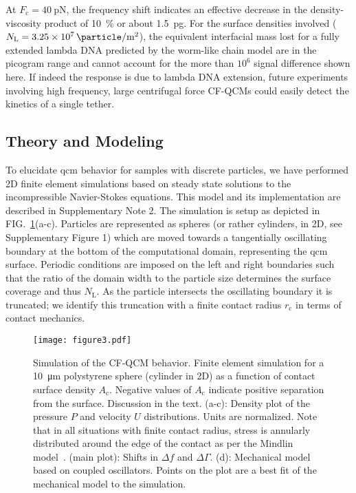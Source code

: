 \documentclass[floatfix,superscriptaddress,a4paper,twocolumn]{revtex4-1}
\newcommand{\Figure}[1]{FIG.~\ref{#1}}
\newcommand{\df}{\Delta\!f}
\newcommand{\dg}{\Delta\Gamma}
\newcommand{\todo}[1]{%
\textcolor{tangoorange}{#1}
}
\begin{document}
At $F_\mathrm{c}=\SI{40}{\pico\newton}$, the frequency shift indicates an
effective decrease in the density-viscosity product of \SI{10}{\percent} or
about \SI{1.5}{\pico\gram}.  For the surface densities involved
($N_\mathrm{L}=\SI{3.25e7}{\particle\per\meter\squared}$), the equivalent
interfacial mass lost for a fully extended lambda DNA predicted by the
worm-like chain model are in the picogram range and cannot account for the
more than $10^6$ signal difference shown here.  If indeed the response is
due to lambda DNA extension, future experiments involving high frequency,
large centrifugal force CF-QCMs could easily detect the kinetics of a
single tether.

\subsection*{Theory and Modeling}
\label{sec:theoryandmodeling}
To elucidate \gls{qcm} behavior for samples with discrete particles, we have
performed 2D finite element simulations based on steady state solutions to
the incompressible Navier-Stokes equations.  This model and its
implementation are described in Supplementary Note 2.  The
simulation is setup as depicted in \mbox{\Figure{fig:lowersphere}(a-c)}.  Particles
are represented as spheres (or rather cylinders, in 2D, see Supplementary
Figure 1) which are moved
towards a tangentially oscillating boundary at the bottom of the
computational domain, representing the \gls{qcm} surface.  Periodic conditions
are imposed on the left and right boundaries such that the ratio of the
domain width to the particle size determines the surface coverage and thus
$N_\mathrm{L}$.  As the particle intersects the oscillating boundary it is
truncated; we identify this truncation with a finite contact radius
$r_\mathrm{c}$ in terms of contact mechanics.
\begin{figure}[ht]
  \centering
  \texttt{[image: figure3.pdf]}
  \caption{%
    Simulation of the CF-QCM behavior.
    Finite element simulation for a \SI{10}{\micro\meter} polystyrene
    sphere (cylinder in 2D) as a function of contact surface density
    $A_\mathrm{c}$.  Negative values of $A_\mathrm{c}$ indicate positive
    separation from the surface.  Discussion in the text. (a-c): Density plot
    of the pressure $P$ and velocity $U$ distributions. Units are normalized.
    Note that in all situations with finite contact radius,
    stress is annularly distributed around the edge of the contact as per the
    Mindlin model~\cite{kumacheva1998interfacial}.
    (main plot): Shifts in $\df$ and $\dg$.
    (d): Mechanical model based on coupled oscillators. Points on the plot are
    a best fit of the mechanical model to the simulation.}
  \label{fig:lowersphere}
\end{figure}
\end{document}
